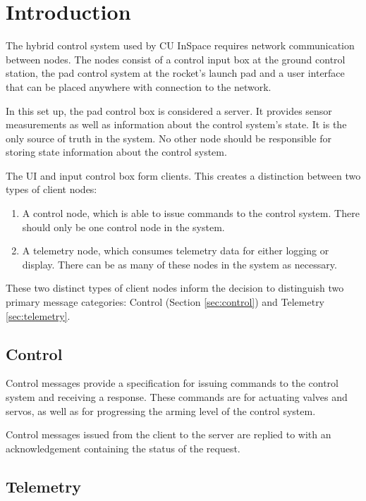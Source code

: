 \section{Introduction}

The hybrid control system used by CU InSpace requires network communication between nodes. The nodes consist of a
control input box at the ground control station, the pad control system at the rocket's launch pad and a user interface
that can be placed anywhere with connection to the network.

In this set up, the pad control box is considered a server. It provides sensor measurements as well as information
about the control system's state. It is the only source of truth in the system. No other node should be responsible for
storing state information about the control system.

The UI and input control box form clients. This creates a distinction between two types of client nodes:

\begin{enumerate}
    \item A control node, which is able to issue commands to the control system. There should only be one control node in the
          system.
    \item A telemetry node, which consumes telemetry data for either logging or display. There can be as many of these nodes in
          the system as necessary.
\end{enumerate}

These two distinct types of client nodes inform the decision to distinguish two primary message categories: Control
(Section \ref{sec:control}) and Telemetry \ref{sec:telemetry}.

\subsection{Control}

Control messages provide a specification for issuing commands to the control system and receiving a response. These
commands are for actuating valves and servos, as well as for progressing the arming level of the control system.

Control messages issued from the client to the server are replied to with an acknowledgement containing the status of
the request.

\subsection{Telemetry}

